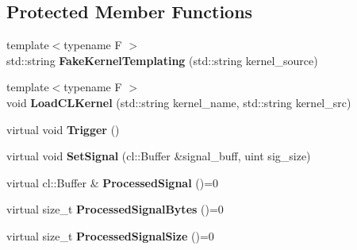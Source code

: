 \subsection*{Protected Member Functions}
\begin{DoxyCompactItemize}
\item 
{\footnotesize template$<$typename F $>$ }\\std\+::string {\bfseries Fake\+Kernel\+Templating} (std\+::string kernel\+\_\+source)\hypertarget{classjaspl_1_1ocl_1_1_task_item_aebceb791e8b1dbe70af39047d8fdae21}{}\label{classjaspl_1_1ocl_1_1_task_item_aebceb791e8b1dbe70af39047d8fdae21}

\item 
{\footnotesize template$<$typename F $>$ }\\void {\bfseries Load\+C\+L\+Kernel} (std\+::string kernel\+\_\+name, std\+::string kernel\+\_\+src)\hypertarget{classjaspl_1_1ocl_1_1_task_item_a02894b39d1d7bfba0ebc43105754b466}{}\label{classjaspl_1_1ocl_1_1_task_item_a02894b39d1d7bfba0ebc43105754b466}

\item 
virtual void {\bfseries Trigger} ()\hypertarget{classjaspl_1_1ocl_1_1_task_item_a186aa96ac98ce8bb8c63818e8b33e3fa}{}\label{classjaspl_1_1ocl_1_1_task_item_a186aa96ac98ce8bb8c63818e8b33e3fa}

\item 
virtual void {\bfseries Set\+Signal} (cl\+::\+Buffer \&signal\+\_\+buff, uint sig\+\_\+size)\hypertarget{classjaspl_1_1ocl_1_1_task_item_a906407a36a6dfb930b37eabaa612cea3}{}\label{classjaspl_1_1ocl_1_1_task_item_a906407a36a6dfb930b37eabaa612cea3}

\item 
virtual cl\+::\+Buffer \& {\bfseries Processed\+Signal} ()=0\hypertarget{classjaspl_1_1ocl_1_1_task_item_adafba6666120958e64a79d444a70fe51}{}\label{classjaspl_1_1ocl_1_1_task_item_adafba6666120958e64a79d444a70fe51}

\item 
virtual size\+\_\+t {\bfseries Processed\+Signal\+Bytes} ()=0\hypertarget{classjaspl_1_1ocl_1_1_task_item_a9e8b6d3a6d0f385cbd411be19f8c7f8d}{}\label{classjaspl_1_1ocl_1_1_task_item_a9e8b6d3a6d0f385cbd411be19f8c7f8d}

\item 
virtual size\+\_\+t {\bfseries Processed\+Signal\+Size} ()=0\hypertarget{classjaspl_1_1ocl_1_1_task_item_a0a7ce3042753ee3f4f0a307b1cf9b0f3}{}\label{classjaspl_1_1ocl_1_1_task_item_a0a7ce3042753ee3f4f0a307b1cf9b0f3}


\end{DoxyCompactItemize}
